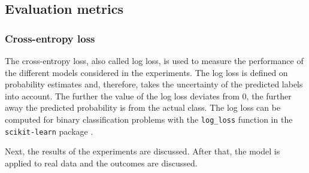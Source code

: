 \documentclass[12pt, a4paper, titlepage]{article}
\begin{document}
					\subsection{Evaluation metrics}
					\label{section:evaluation}


\subsubsection{Cross-entropy loss}
The cross-entropy loss, also called log loss, is used to measure the performance of the different models considered in the experiments. The log loss is defined on probability estimates and, therefore, takes the uncertainty of the predicted labels into account. The further the value of the log loss deviates from 0, the further away the predicted probability is from the actual class. The log loss can be computed for binary classification problems with the \texttt{log\_loss} function in the \texttt{scikit-learn} package \citep{sklearn}. 


\bigskip

Next, the results of the experiments are discussed. After that, the model is applied to real data and the outcomes are discussed.


\clearpage %

 

\end{document}
